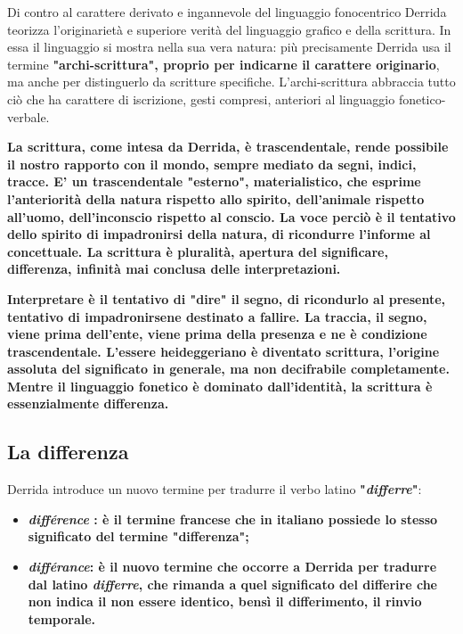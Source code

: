 Di contro al carattere derivato e ingannevole
del linguaggio fonocentrico Derrida teorizza
l'originarietà e superiore verità del linguaggio
grafico e della scrittura. In essa il linguaggio
si mostra nella sua vera natura: più precisamente
Derrida usa il termine \textbf{"archi-scrittura", proprio per
indicarne il carattere originario}, ma anche per
distinguerlo da scritture specifiche.
L'archi-scrittura abbraccia tutto ciò che ha
carattere di iscrizione, gesti compresi, anteriori
al linguaggio fonetico-verbale.  

\textbf{La scrittura, come
intesa da Derrida, è trascendentale, rende
possibile il nostro rapporto con il mondo, sempre
mediato da segni, indici, tracce. E' un trascendentale
"esterno", materialistico, che esprime l'anteriorità
della natura rispetto allo spirito, dell'animale
rispetto all'uomo, dell'inconscio rispetto al
conscio.
La voce perciò è il tentativo dello spirito di
impadronirsi della natura, di ricondurre l'informe
al concettuale.
La scrittura è pluralità, apertura del significare, differenza, infinità mai
conclusa delle interpretazioni.}

\textbf{Interpretare è il tentativo di "dire" il segno, di ricondurlo al presente, tentativo di
impadronirsene destinato a fallire.
La traccia, il segno, viene prima dell'ente, viene
prima della presenza e ne è condizione trascendentale.
L'essere heideggeriano è diventato scrittura,
l'origine assoluta del significato in generale, ma
non decifrabile completamente. Mentre il linguaggio
fonetico è dominato dall'identità, la scrittura
è essenzialmente differenza.}

\subsection{La differenza}

Derrida introduce un nuovo termine per tradurre
il verbo latino \textbf{"\textit{differre}"}:

\begin{itemize}
	\item \textbf{\textit{différence} : è il termine francese che in italiano
	possiede lo stesso significato del termine "differenza";}
	\item \textbf{\textit{différance}: è il nuovo termine che occorre a Derrida
	per tradurre dal latino \textit{differre}, che rimanda a quel
	significato del differire che non indica il
	non essere identico, bensì il differimento, il
	rinvio temporale.}
\end{itemize}

